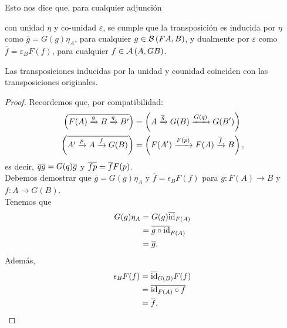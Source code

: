 Esto nos dice que, para cualquier adjunción 
\begin{center}
\end{center}
con unidad $\eta$ y co-unidad $\varepsilon$, se cumple que la transposición es inducida por $\eta$ como $\overline{g}=G(g)\eta_A$, para cualquier $g\in\mathcal{B}\left({FA,B}\right)$, y dualmente por $\varepsilon$ como $\overline{f}=\varepsilon_BF(f)$, para cualquier $f\in\mathcal{A}\left({A,GB}\right)$.
\begin{exe}%
  Las transposiciones inducidas por la
  unidad y counidad coinciden con las transposiciones
  originales.
\end{exe}
\begin{proof}
    Recordemos que, por compatibilidad:
    \begin{align*}
        \left(\overline{F(A)\xrightarrow{g} B \xrightarrow{q} B'}\right)
        &=
        \left(A\xrightarrow{\overline{g}} G(B) \xrightarrow{G(q)}G(B')\right) \\
        \left(\overline{A'\xrightarrow{p} A \xrightarrow{f} G(B)}\right)
        &=
        \left(F(A')\xrightarrow{F(p)} F(A) \xrightarrow{\overline{f}}B\right),
    \end{align*}
    es decir, $\overline{qg}=G(q)\overline{g}$ y $\overline{fp}=\overline{f} F(p)$.\\
    Debemos demostrar que $\overline{g}=G(g)\eta_A$ y $\overline{f}=\epsilon_BF(f)$ para $g\colon F(A)\to B$ y $f\colon A\to G(B)$.\\
Tenemos que
\begin{align*}
G(g)\eta_A&=G(g)\overline{\mathrm{id}}_{F(A)}\\
&=\overline{g\circ \mathrm{id}}_{F(A)}\\
&=\overline{g}.
\end{align*}
Además, 
\begin{align*}
\epsilon_B F(f)&=\overline{\mathrm{id}}_{G(B)}F(f)\\
&=\overline{\mathrm{id}_{F(A)}\circ f}\\
&=\overline{f}.
\end{align*}
\end{proof}


